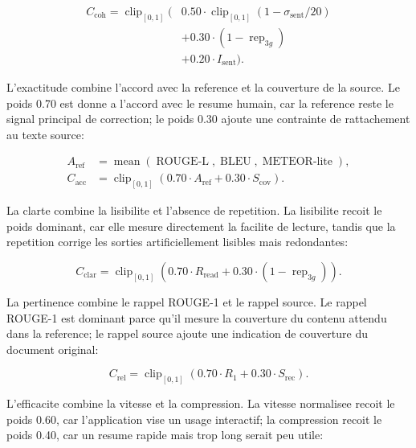 \begin{align}
C_{\mathrm{coh}} = \operatorname{clip}_{[0,1]}(&0.50 \cdot \operatorname{clip}_{[0,1]}(1-\sigma_{\mathrm{sent}}/20) \nonumber\\
&+0.30 \cdot (1-\operatorname{rep}_{3g}) \nonumber\\
&+0.20 \cdot I_{\mathrm{sent}}).
\label{eq:coherence}
\end{align}

L'exactitude combine l'accord avec la reference et la couverture de la source. Le poids 0.70 est donne a l'accord avec le resume humain, car la reference reste le signal principal de correction; le poids 0.30 ajoute une contrainte de rattachement au texte source:

\begin{align}
A_{\mathrm{ref}} &= \operatorname{mean}(\operatorname{ROUGE\mbox{-}L}, \operatorname{BLEU}, \operatorname{METEOR\mbox{-}lite}), \\
C_{\mathrm{acc}} &= \operatorname{clip}_{[0,1]}(0.70 \cdot A_{\mathrm{ref}} + 0.30 \cdot S_{\mathrm{cov}}).
\label{eq:accuracy}
\end{align}

La clarte combine la lisibilite et l'absence de repetition. La lisibilite recoit le poids dominant, car elle mesure directement la facilite de lecture, tandis que la repetition corrige les sorties artificiellement lisibles mais redondantes:

\begin{equation}
C_{\mathrm{clar}} =
\operatorname{clip}_{[0,1]}(0.70 \cdot R_{\mathrm{read}} + 0.30 \cdot (1-\operatorname{rep}_{3g})).
\label{eq:clarity}
\end{equation}

La pertinence combine le rappel ROUGE-1 et le rappel source. Le rappel ROUGE-1 est dominant parce qu'il mesure la couverture du contenu attendu dans la reference; le rappel source ajoute une indication de couverture du document original:

\begin{equation}
C_{\mathrm{rel}} =
\operatorname{clip}_{[0,1]}(0.70 \cdot R_{1} + 0.30 \cdot S_{\mathrm{rec}}).
\label{eq:relevance}
\end{equation}

L'efficacite combine la vitesse et la compression. La vitesse normalisee recoit le poids 0.60, car l'application vise un usage interactif; la compression recoit le poids 0.40, car un resume rapide mais trop long serait peu utile:

